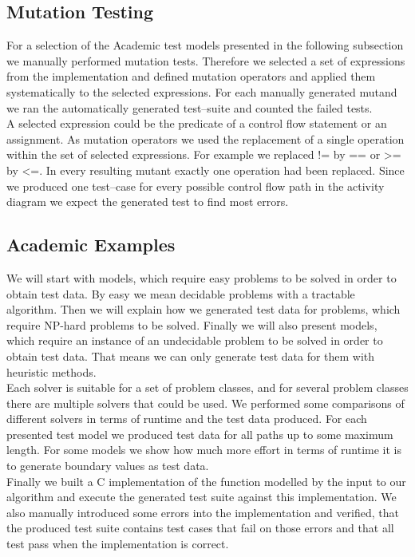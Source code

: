 \subsection{Mutation Testing}
For a selection of the Academic test models presented in the following subsection we manually performed mutation tests. Therefore we selected a set of expressions from the implementation and defined mutation operators and applied them systematically to the selected expressions. For each manually generated mutand we ran the automatically generated test--suite and counted the failed tests.\\
A selected expression could be the predicate of a control flow statement or an assignment. As mutation operators we used the replacement of a single operation within the set of selected expressions. For example we replaced != by == or >= by <=. In every resulting mutant exactly one operation had been replaced. Since we produced one test--case for every possible control flow path in the activity diagram we expect the generated test to find most errors.
\subsection{Academic Examples}
\label{sec:evaluationAcademicModels}
We will start with models, which require easy problems to be solved in order to obtain test data. By easy we mean decidable problems with a tractable algorithm. Then we will explain how we generated test data for problems, which require NP-hard problems to be solved. Finally we will also present models, which require an instance of an undecidable problem to be solved in order to obtain test data. That means we can only generate test data for them with heuristic methods.\\
Each solver is suitable for a set of problem classes, and for several problem classes there are multiple solvers that could be used. We performed some comparisons of different solvers in terms of runtime and the test data produced. For each presented test model we produced test data for all paths up to some maximum length.
For some models we show how much more effort in terms of runtime it is to generate boundary values as test data.\\
Finally we built a C implementation of the function modelled by the input to our algorithm and execute the generated test suite against this implementation. We also manually introduced some errors into the implementation and verified, that the produced test suite contains test cases that fail on those errors and that all test pass when the implementation is correct.
